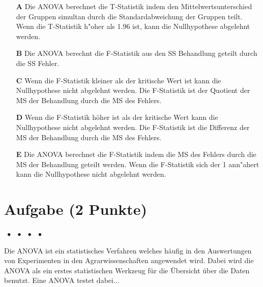\documentclass[a4paper, 9pt]{scrartcl}\usepackage[]{graphicx}\usepackage[]{xcolor}
\begin{document}
\begin{enumerate}
\item [\textbf{A} \msquare] Die ANOVA berechnet die T-Statistik indem den Mittelwertsunterschied der Gruppen simultan durch die Standardabweichung der Gruppen teilt. Wenn die T-Statistik h{"o}her als 1.96 ist, kann die Nullhypothese abgelehnt werden.
\item [\textbf{B} \msquare] Die ANOVA berechnt die F-Statistik aus den SS Behandlung geteilt durch die SS Fehler.
\item [\textbf{C} \msquare] Wenn die F-Statistik kleiner als der kritische Wert ist kann die Nullhypothese nicht abgelehnt werden. Die F-Statistik ist der Quotient der MS der Behandlung durch die MS des Fehlers.
\item [\textbf{D} \msquare] Wenn die F-Statistik höher ist als der kritische Wert kann die Nullhypothese nicht abgelehnt werden. Die F-Statistik ist die Differenz der MS der Behandlung durch die MS des Fehlers.
\item [\textbf{E} \msquare] Die ANOVA berechnet die F-Statistik indem die MS des Fehlers durch die MS der Behandlung geteilt werden. Wenn die F-Statistik sich der 1 ann{"a}hert kann die Nullhypothese nicht abgelehnt werden.
\end{enumerate}

\section{Aufgabe \hfill (2 Punkte)}

\ifcollection
\begin{flushright}
\tiny\vspace{-2Ex}
\textbf{\examinhaltstart}
\exammodulemathstat $\;\bullet$
\exammodulestat $\;\bullet$
\exammodulestatbbv $\;\bullet$
\exammodulestatversuch $\;\bullet$
\exammodulebiostat
\vspace{-1Ex}
\end{flushright}
\fi




Die ANOVA ist ein statistisches Verfahren welches häufig in den Auswertungen von Experimenten in den Agrarwissenschaften angewendet
wird. Dabei wird die ANOVA als ein erstes statistischen Werkzeug für die
Übersicht über die Daten benutzt. Eine ANOVA testet dabei...
\end{document}
